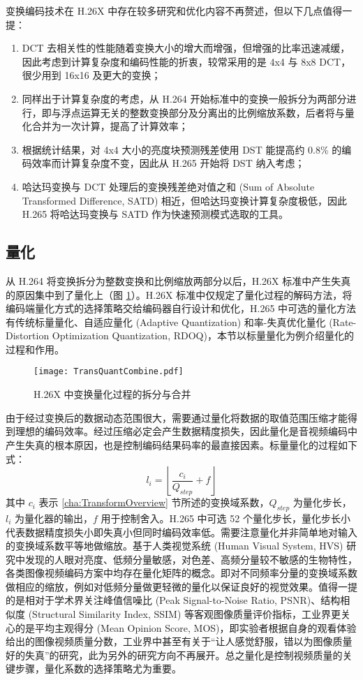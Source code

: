 变换编码技术在 H.26X 中存在较多研究和优化内容不再赘述，但以下几点值得一提：
\begin{enumerate}
    \item DCT 去相关性的性能随着变换大小的增大而增强，但增强的比率迅速减缓，因此考虑到计算复杂度和编码性能的折衷，较常采用的是 4x4 与 8x8 DCT，很少用到 16x16 及更大的变换；
    \item 同样出于计算复杂度的考虑，从 H.264 开始标准中的变换一般拆分为两部分进行，即与浮点运算无关的整数变换部分及分离出的比例缩放系数，后者将与量化合并为一次计算，提高了计算效率；
    \item 根据统计结果，对 4x4 大小的亮度块预测残差使用 DST 能提高约 0.8\% 的编码效率而计算复杂度不变，因此从 H.265 开始将 DST 纳入考虑；
    \item 哈达玛变换与 DCT 处理后的变换残差绝对值之和 (Sum of Absolute Transformed Difference, SATD) 相近，但哈达玛变换计算复杂度极低，因此 H.265 将哈达玛变换与 SATD 作为快速预测模式选取的工具。
\end{enumerate}

\subsection{量化}
从 H.264 将变换拆分为整数变换和比例缩放两部分以后，H.26X 标准中产生失真的原因集中到了量化上（图 \ref{fig:TransQuantCombine}）。H.26X 标准中仅规定了量化过程的解码方法，将编码端量化方式的选择策略交给编码器自行设计和优化，H.265 中可选的量化方法有传统标量量化、自适应量化 (Adaptive Quantization) 和率-失真优化量化 (Rate-Distortion Optimization Quantization, RDOQ)，本节以标量量化为例介绍量化的过程和作用。
\begin{figure}[hbt]
    \centering
    \texttt{[image: TransQuantCombine.pdf]}
    \caption{H.26X 中变换量化过程的拆分与合并}
    \label{fig:TransQuantCombine}
\end{figure}

由于经过变换后的数据动态范围很大，需要通过量化将数据的取值范围压缩才能得到理想的编码效率。经过压缩必定会产生数据精度损失，因此量化是音视频编码中产生失真的根本原因，也是控制编码结果码率的最直接因素。标量量化的过程如下式：
\begin{equation}
    l_i=\left\lfloor \frac{c_i}{Q_{step}}+f \right\rfloor
\end{equation}
其中 $c_i$ 表示 \ref{cha:TransformOverview} 节所述的变换域系数，$Q_{step}$ 为量化步长，$l_i$ 为量化器的输出，$f$ 用于控制舍入。H.265 中可选 52 个量化步长，量化步长小代表数据精度损失小即失真小但同时编码效率低。需要注意量化并非简单地对输入的变换域系数平等地做缩放。基于人类视觉系统 (Human Visual System, HVS) 研究中发现的人眼对亮度、低频分量敏感，对色差、高频分量较不敏感的生物特性，各类图像视频编码方案中均存在量化矩阵的概念。即对不同频率分量的变换域系数做相应的缩放，例如对低频分量做更轻微的量化以保证良好的视觉效果。值得一提的是相对于学术界关注峰值信噪比 (Peak Signal-to-Noise Ratio, PSNR)、结构相似度 (Structural Similarity Index, SSIM) 等客观图像质量评价指标，工业界更关心的是平均主观得分 (Mean Opinion Score, MOS)，即实验者根据自身的观看体验给出的图像视频质量分数，工业界中甚至有关于“让人感觉舒服，错以为图像质量好的失真”的研究，此为另外的研究方向不再展开。总之量化是控制视频质量的关键步骤，量化系数的选择策略尤为重要。

